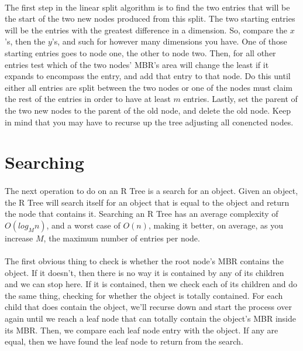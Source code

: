 \documentclass{article}
\begin{document}
\begin{multicols}{2}[]
\paragraph{}
The first step in the linear split algorithm is to find the two entries that will be the
start of the two new nodes produced from this split. The two starting entries will be the
entries with the greatest difference in a dimension. So, compare the $x$'s, then the $y$'s,
and such for however many dimensions you have. One of those starting entries goes to node one,
the other to node two. Then, for all other entries test which of the two nodes' MBR's area
will change the least if it expands to encompass the entry, and add that entry to that node. Do this
until either all entries are split between the two nodes or one of the nodes must claim the
rest of the entries in order to have at least $m$ entries. Lastly, set the parent of the two
new nodes to the parent of the old node, and delete the old node. Keep in mind that you may have to
recurse up the tree adjusting all conencted nodes.
\section{Searching}
\paragraph{}
The next operation to do on an R Tree is a search for an object. Given an object, the R Tree will search itself for
an object that is equal to the object and return the node that contains it. Searching an R Tree has an average complexity
of $O(log_Mn)$, and a worst case of $O(n)$, making it better, on average, as you increase $M$, the maximum number of entries
per node.
\paragraph{}
The first obvious thing to check is whether the root
node's MBR contains the object. If it doesn't, then there is no way it is contained by any of its children and we can stop here.
If it is contained, then we check each of its children and do the same thing, checking for whether the object is totally contained.
For each child that does contain the object, we'll recurse down and start the process over again until we reach a leaf node that
can totally contain the object's MBR inside its MBR. Then, we compare each leaf node entry with the object. If any are equal, then
we have found the leaf node to return from the search.


\end{multicols}
\end{document}
